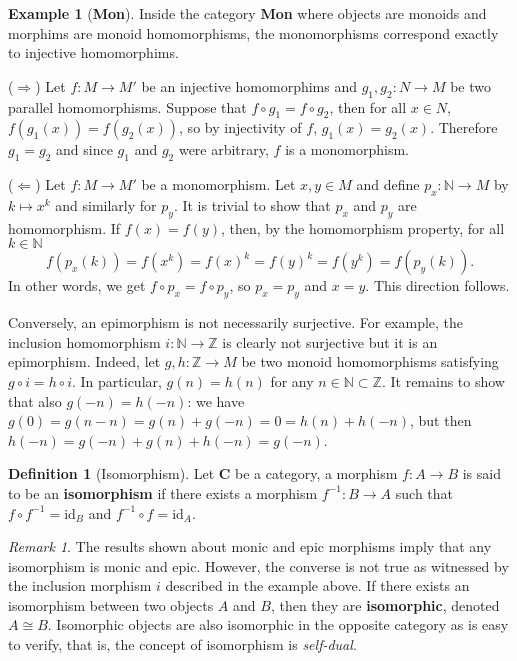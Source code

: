 \documentclass{article}
\theoremstyle{definition}
\newtheorem{defn}[thm]{Definition}
\newtheorem{exmp}[thm]{Example}
\theoremstyle{remark}
\newtheorem{rem}[thm]{Remark}
\newcommand{\N}{\mathbb{N}}
\newcommand{\Z}{\mathbb{Z}}
\newcommand{\id}{\text{id}}
\begin{document}
\begin{exmp}[\textbf{Mon}]
Inside the category \textbf{Mon} where objects are monoids and morphims are monoid homomorphisms, the monomorphisms correspond exactly to injective homomorphims.

($\Rightarrow$) Let $f:M\rightarrow M'$ be an injective homomorphims and $g_1,g_2:N\rightarrow M$ be two parallel homomorphisms. Suppose that $f\circ g_1 = f\circ g_2$, then for all $x \in N$, $f(g_1(x)) = f(g_2(x))$, so by injectivity of $f$, $g_1(x) = g_2(x)$. Therefore $g_1 = g_2$ and since $g_1$ and $g_2$ were arbitrary, $f$ is a monomorphism.

($\Leftarrow$) Let $f:M\rightarrow M'$ be a monomorphism. Let $x,y \in M$ and define $p_x :\N \rightarrow M$ by $k\mapsto x^k$ and similarly for $p_y$. It is trivial to show that $p_x$ and $p_y$ are homomorphism. If $f(x) = f(y)$, then, by the homomorphism property, for all $k \in \N$
\[f(p_x(k))= f(x^k) = f(x)^k  = f(y)^k = f(y^k) = f(p_y(k)).\]
In other words, we get $f\circ p_x = f \circ p_y$, so $p_x = p_y$ and $x = y$. This direction follows.

Conversely, an epimorphism is not necessarily surjective. For example, the inclusion homomorphism $i:\N \rightarrow \Z$ is clearly not surjective but it is an epimorphism. Indeed, let $g,h: \Z\rightarrow M$ be two monoid homomorphisms satisfying $g \circ i = h\circ i$. In particular, $g(n) = h(n)$ for any $n \in \N\subset \Z$. It remains to show that also $g(-n) = h(-n)$: we have $ g(0) = g(n-n) = g(n) + g(-n) = 0 = h(n) + h(-n) $, but then $ h(-n) = g(-n) + g(n) + h(-n) = g(-n) $.
\end{exmp}
\begin{defn}[Isomorphism]
	Let $\mathbf{C}$ be a category, a morphism $f:A\rightarrow B$ is said to be an \textbf{isomorphism} if there exists a morphism $f^{-1}: B\rightarrow A$ such that $f\circ f^{-1} = \id_B$ and $f^{-1}\circ f = \id_A$.
\end{defn}
\begin{rem}
	The results shown about monic and epic morphisms imply that any isomorphism is monic and epic. However, the converse is not true as witnessed by the inclusion morphism $i$ described in the example above. If there exists an isomorphism between two objects $A$ and $B$, then they are \textbf{isomorphic}, denoted $A \cong B$. Isomorphic objects are also isomorphic in the opposite category as is easy to verify, that is, the concept of isomorphism is \textit{self-dual}.
\end{rem}
\end{document}

